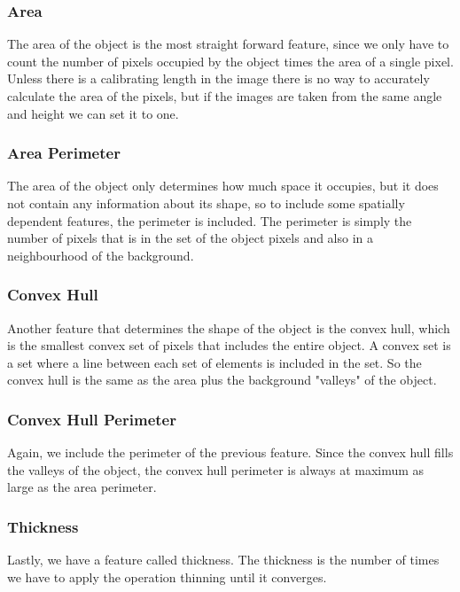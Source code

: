 \subsubsection{Area}

The area of the object is the most straight forward feature, since we only have to count the number of pixels occupied by the object times the area of a single pixel. Unless there is a calibrating length in the image there is no way to accurately calculate the area of the pixels, but if the images are taken from the same angle and height we can set it to one.

\subsubsection{Area Perimeter}

The area of the object only determines how much space it occupies, but it does not contain any information about its shape, so to include some spatially dependent features, the perimeter is included. The perimeter is simply the number of pixels that is in the set of the object pixels and also in a neighbourhood of the background.

\subsubsection{Convex Hull}

Another feature that determines the shape of the object is the convex hull, which is the smallest convex set of pixels that includes the entire object. A convex set is a set where a line between each set of elements is included in the set. So the convex hull is the same as the area plus the background "valleys" of the object.

\subsubsection{Convex Hull Perimeter}

Again, we include the perimeter of the previous feature. Since the convex hull fills the valleys of the object, the convex hull perimeter is always at maximum as large as the area perimeter.

\subsubsection{Thickness}

Lastly, we have a feature called thickness. The thickness is the number of times we have to apply the operation thinning \cite{diProcessing} until it converges.

